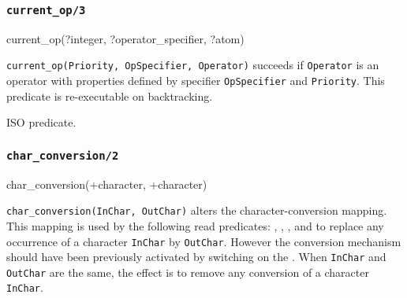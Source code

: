 \subsubsection{\texttt{current\_op/3}}

\begin{TemplatesOneCol}
current\_op(?integer, ?operator\_specifier, ?atom)

\end{TemplatesOneCol}

\Description

\texttt{current\_op(Priority, OpSpecifier, Operator)} succeeds if
\texttt{Operator} is an operator with properties defined by specifier
\texttt{OpSpecifier} and \texttt{Priority}. This predicate is re-executable
on backtracking.

\begin{PlErrors}




\end{PlErrors}

\Portability

ISO predicate. 

\subsubsection{\texttt{char\_conversion/2}}
\label{char-conversion/2}

\begin{TemplatesOneCol}
char\_conversion(+character, +character)

\end{TemplatesOneCol}

\Description

\texttt{char\_conversion(InChar, OutChar)} alters the character-conversion
mapping. This mapping is used by the following read predicates:
 , ,
,   and
  to replace any occurrence of a
character \texttt{InChar} by \texttt{OutChar}. However the conversion
mechanism should have been previously activated by switching on the
  . When
\texttt{InChar} and \texttt{OutChar} are the same, the effect is to remove
any conversion of a character \texttt{InChar}.

